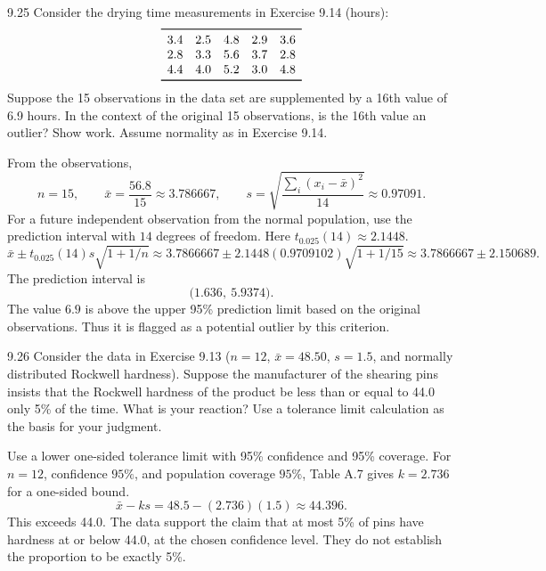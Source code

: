 \documentclass[11pt,oneside]{article}
\begin{document}
\begin{exercise}{9.25}
Consider the drying time measurements in Exercise 9.14 (hours):
\[
\begin{array}{ccccc}\toprule
3.4 & 2.5 & 4.8 & 2.9 & 3.6\\
2.8 & 3.3 & 5.6 & 3.7 & 2.8\\
4.4 & 4.0 & 5.2 & 3.0 & 4.8\\
\bottomrule\end{array}
\]
Suppose the 15 observations in the data set are supplemented by a 16th value of 6.9 hours. In the context of the original 15 observations, is the 16th value an outlier? Show work. Assume normality as in Exercise 9.14.
\end{exercise}
\begin{solution}
From the observations, 
\[
n=15,\qquad\bar x=\frac{56.8}{15}\approx3.786667,\qquad s=\sqrt{\frac{\sum_i(x_i-\bar x)^2}{14}}\approx0.97091.
\]
For a future independent observation from the normal population, use the prediction interval with $14$ degrees of freedom. Here $t_{0.025}(14)\approx 2.1448$.
\[
\bar x\pm t_{0.025}(14)s\sqrt{1+1/n}\approx 3.7866667\pm 2.1448(0.9709102)\sqrt{1+1/15}\approx 3.7866667\pm 2.150689.
\]
The prediction interval is 
\[
\boxed{\bigl(1.636,\ 5.9374\bigr)}.
\]
The value $6.9$ is above the upper 95\% prediction limit based on the original observations. Thus it is flagged as a potential outlier by this criterion.
\end{solution}

\begin{exercise}{9.26}
Consider the data in Exercise 9.13 ($n=12$, $\bar x=48.50$, $s=1.5$, and normally distributed Rockwell hardness). Suppose the manufacturer of the shearing pins insists that the Rockwell hardness of the product be less than or equal to 44.0 only 5\% of the time. What is your reaction? Use a tolerance limit calculation as the basis for your judgment.
\end{exercise}
\begin{solution}
Use a lower one-sided tolerance limit with 95\% confidence and 95\% coverage. For $n=12$, confidence $95\%$, and population coverage $95\%$, Table A.7 gives $k=2.736$ for a one-sided bound.
\[
\bar x-ks=48.5-(2.736)(1.5)\approx\boxed{44.396}.
\]
This exceeds 44.0. The data support the claim that at most 5\% of pins have hardness at or below 44.0, at the chosen confidence level. They do not establish the proportion to be exactly 5\%.
\end{solution}
\end{document}
